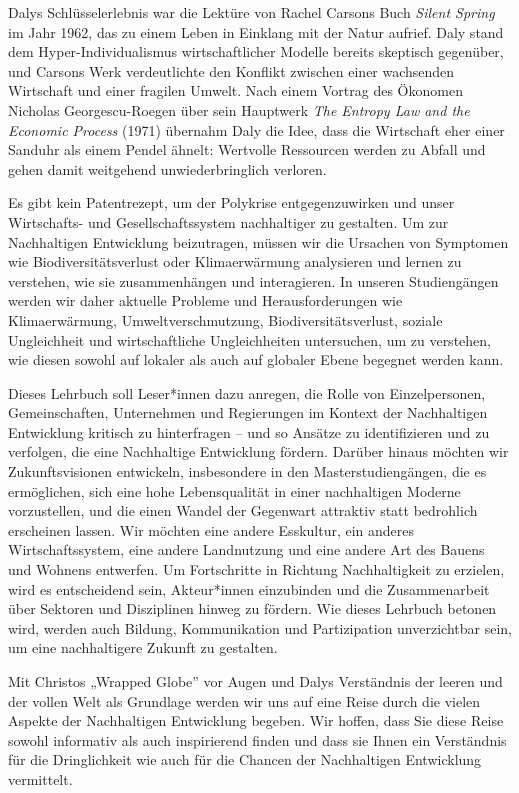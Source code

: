 \documentclass[
  nswissgerman,
  a4paper,
  openany]{book}
\begin{document}
Dalys Schlüsselerlebnis war die Lektüre von Rachel Carsons Buch
\emph{Silent Spring} im Jahr 1962, das zu einem Leben in Einklang mit
der Natur aufrief. Daly stand dem Hyper-Individualismus wirtschaftlicher
Modelle bereits skeptisch gegenüber, und Carsons Werk verdeutlichte den
Konflikt zwischen einer wachsenden Wirtschaft und einer fragilen Umwelt.
Nach einem Vortrag des Ökonomen Nicholas Georgescu-Roegen über sein
Hauptwerk \emph{The Entropy Law and the Economic Process} (1971)
übernahm Daly die Idee, dass die Wirtschaft eher einer Sanduhr als einem
Pendel ähnelt: Wertvolle Ressourcen werden zu Abfall und gehen damit
weitgehend unwiederbringlich verloren.

Es gibt kein Patentrezept, um der Polykrise entgegenzuwirken und unser
Wirtschafts- und Gesellschaftssystem nachhaltiger zu gestalten. Um zur
Nachhaltigen Entwicklung beizutragen, müssen wir die Ursachen von
Symptomen wie Biodiversitätsverlust oder Klimaerwärmung analysieren und
lernen zu verstehen, wie sie zusammenhängen und interagieren. In unseren
Studiengängen werden wir daher aktuelle Probleme und Herausforderungen
wie Klimaerwärmung, Umweltverschmutzung, Biodiversitätsverlust, soziale
Ungleichheit und wirtschaftliche Ungleichheiten untersuchen, um zu
verstehen, wie diesen sowohl auf lokaler als auch auf globaler Ebene
begegnet werden kann.

Dieses Lehrbuch soll Leser*innen dazu anregen, die Rolle von
Einzelpersonen, Gemeinschaften, Unternehmen und Regierungen im Kontext
der Nachhaltigen Entwicklung kritisch zu hinterfragen -- und so Ansätze
zu identifizieren und zu verfolgen, die eine Nachhaltige Entwicklung
fördern. Darüber hinaus möchten wir Zukunftsvisionen entwickeln,
insbesondere in den Masterstudiengängen, die es ermöglichen, sich eine
hohe Lebensqualität in einer nachhaltigen Moderne vorzustellen, und die
einen Wandel der Gegenwart attraktiv statt bedrohlich erscheinen lassen.
Wir möchten eine andere Esskultur, ein anderes Wirtschaftssystem, eine
andere Landnutzung und eine andere Art des Bauens und Wohnens entwerfen.
Um Fortschritte in Richtung Nachhaltigkeit zu erzielen, wird es
entscheidend sein, Akteur*innen einzubinden und die Zusammenarbeit über
Sektoren und Disziplinen hinweg zu fördern. Wie dieses Lehrbuch betonen
wird, werden auch Bildung, Kommunikation und Partizipation unverzichtbar
sein, um eine nachhaltigere Zukunft zu gestalten.

Mit Christos „Wrapped Globe'' vor Augen und Dalys Verständnis der leeren
und der vollen Welt als Grundlage werden wir uns auf eine Reise durch
die vielen Aspekte der Nachhaltigen Entwicklung begeben. Wir hoffen,
dass Sie diese Reise sowohl informativ als auch inspirierend finden und
dass sie Ihnen ein Verständnis für die Dringlichkeit wie auch für die
Chancen der Nachhaltigen Entwicklung vermittelt.
\end{document}
